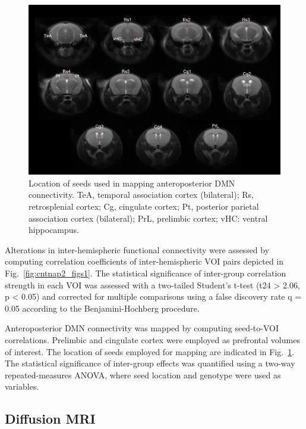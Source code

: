 \begin{figure}[th] 
    \centering
    \includegraphics[scale=0.6]{figures/cntnap2_figure_s2.png}
    \decoRule
    \caption[Location of seeds used in mapping anteroposterior DMN
    connectivity.]{Location of seeds used in mapping anteroposterior DMN
    connectivity. TeA, temporal association cortex (bilateral); Rs,
    retrosplenial cortex; Cg, cingulate cortex; Pt, posterior parietal
    association cortex (bilateral); PrL, prelimbic cortex; vHC: ventral
    hippocampus.}
    \label{fig:cntnap2_figs2}
\end{figure}

Alterations in inter-hemispheric functional connectivity were assessed by
computing correlation coefficients of inter-hemispheric VOI pairs depicted in
Fig.~\ref{fig:cntnap2_figs1}. The statistical significance of inter-group
correlation strength in each VOI was assessed with a two-tailed Student’s t-test
(t24 > 2.06, p < 0.05) and corrected for multiple comparisons using a false
discovery rate q = 0.05 according to the Benjamini-Hochberg procedure.

Anteroposterior DMN connectivity was mapped by computing seed-to-VOI
correlations. Prelimbic and cingulate cortex were employed as prefrontal volumes
of interest. The location of seeds employed for mapping are indicated in
Fig.~\ref{fig:cntnap2_figs2}. The statistical significance of inter-group
effects was quantified using a two-way repeated-measures ANOVA, where seed
location and genotype were used as variables. 

\subsection{Diffusion MRI}

